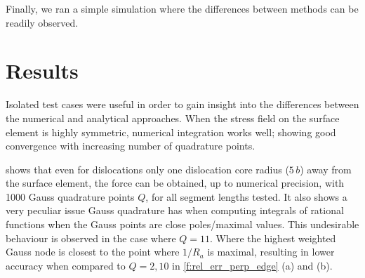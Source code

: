 \documentclass[11pt]{iopart}
\begin{document}
Finally, we ran a simple simulation where the differences between methods can be readily observed.

\section{Results}\label{s:results}

Isolated test cases were useful in order to gain insight into the differences between the numerical and analytical approaches. When the stress field on the surface element is highly symmetric, numerical integration works well; showing good convergence with increasing number of quadrature points.

 shows that even for dislocations only one dislocation core radius ($5\, b$) away from the surface element, the force can be obtained, up to numerical precision, with 1000 Gauss quadrature points $Q$, for all segment lengths tested. It also shows a very peculiar issue Gauss quadrature has when computing integrals of rational functions when the Gauss points are close poles/maximal values. This undesirable behaviour is observed in the case where $Q = 11$. Where the highest weighted Gauss node is closest to the point where $1/R_{a}$ is maximal, resulting in lower accuracy when compared to $Q = 2, 10$ in \cref{f:rel_err_perp_edge} (a) and (b).
\end{document}
